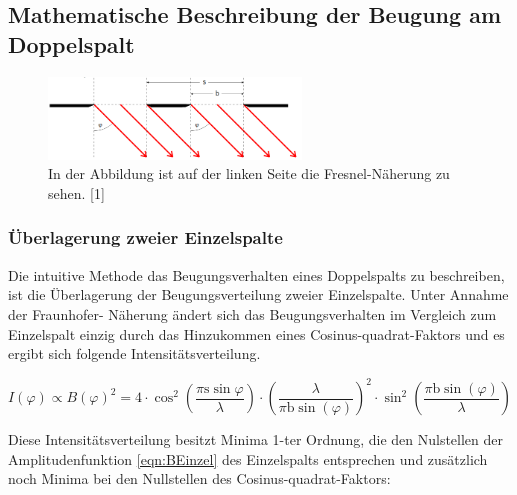 \documentclass[titlepage = firstcover]{scrartcl}
\begin{document}
            \newpage
            \subsection{Mathematische Beschreibung der Beugung am Doppelspalt}
                \FloatBarrier

                \begin{figure}[h]
                  \centering
                  \includegraphics[width = 0.6\textwidth]{Bilder/Doppelspalt.png}
                  \caption{In der Abbildung ist auf der linken Seite die Fresnel-Näherung zu sehen. [1]}
                  \label{fig:Doppelspalt}
                \end{figure}
            
                \FloatBarrier
            
                \noindent
                \subsubsection*{Überlagerung zweier Einzelspalte}
                    Die intuitive Methode das Beugungsverhalten eines Doppelspalts zu beschreiben, ist die Überlagerung der Beugungsverteilung zweier Einzelspalte. Unter Annahme der Fraunhofer-
                    Näherung ändert sich das Beugungsverhalten im Vergleich zum Einzelspalt einzig durch das Hinzukommen eines Cosinus-quadrat-Faktors und es ergibt sich folgende 
                    Intensitätsverteilung.

                    \begin{equation}
                        I(\varphi) \propto B(\varphi)^2 = 4 \cdot \cos^2\left(\frac{\pi \text{s} \sin \varphi}{\lambda}\right) \cdot \left(\frac{\lambda}{\pi \text{b} \sin(\varphi)}\right)^2 \cdot \sin^2 \left(\frac{\pi \text{b} \sin(\varphi)}{\lambda}\right)
                        \label{eqn:IDoppel}
                    \end{equation}

                    \noindent
                    Diese Intensitätsverteilung besitzt Minima 1-ter Ordnung, die den Nulstellen der Amplitudenfunktion \ref{eqn:BEinzel} des Einzelspalts entsprechen und zusätzlich noch Minima bei
                    den Nullstellen des Cosinus-quadrat-Faktors:
\end{document}

